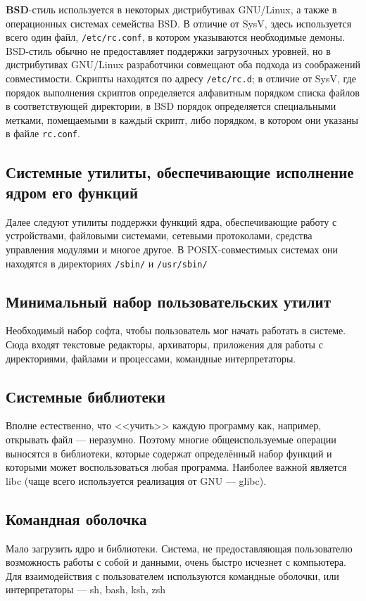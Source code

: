  \textbf{BSD}-стиль используется в некоторых дистрибутивах GNU/Linux, а также в операционных системах семейства BSD. В отличие от SysV, здесь используется всего один файл, \texttt{/etc/rc.conf}, в котором указываются необходимые демоны. BSD-стиль обычно не предоставляет поддержки загрузочных уровней, но в дистрибутивах GNU/Linux разработчики совмещают оба подхода из соображений совместимости.
 Скрипты находятся по адресу \texttt{/etc/rc.d}; в отличие от SysV, где порядок выполнения скриптов определяется алфавитным порядком списка файлов в соответствующей директории, в BSD порядок определяется специальными метками, помещаемыми в каждый скрипт, либо порядком, в котором они указаны в файле \texttt{rc.conf}.
 
\subsection{Системные утилиты, обеспечивающие исполнение ядром его функций}
Далее следуют утилиты поддержки функций ядра, обеспечивающие работу с устройствами, файловыми системами, сетевыми протоколами, средства управления модулями и многое другое. В POSIX-совместимых системах они находятся в директориях \texttt{/sbin/} и \texttt{/usr/sbin/}

\subsection{Минимальный набор пользовательских утилит}
Необходимый набор софта, чтобы пользователь мог начать работать в системе. Сюда входят текстовые редакторы, архиваторы, приложения для работы с директориями, файлами и процессами, командные интерпретаторы.

\subsection{Системные библиотеки}
Вполне естественно, что <<учить>> каждую программу как, например, открывать файл --- неразумно. Поэтому многие общеиспользуемые операции выносятся в библиотеки, которые содержат определённый набор функций и которыми может воспользоваться любая программа. Наиболее важной является libc (чаще всего используется реализация от GNU --- glibc).

\subsection{Командная оболочка}
Мало загрузить ядро и библиотеки. Система, не предоставляющая пользователю возможность работы с собой и данными, очень быстро исчезнет с компьютера. Для взаимодействия с пользователем используются командные оболочки, или интерпретаторы --- sh, bash, ksh, zsh

